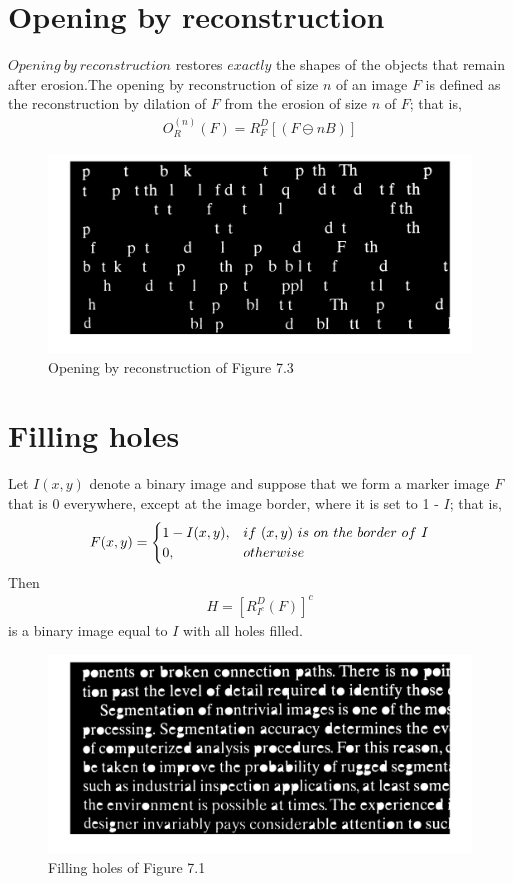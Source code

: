 \documentclass[11pt,oneside]{book}
\begin{document}
\section{Opening by reconstruction}
$Opening\ by\ reconstruction$ restores $exactly$ the shapes of the objects that remain after erosion.The opening by reconstruction of size $n$ of an image $F$ is defined as the reconstruction by dilation of $F$ from the erosion of size $n$ of $F$; that is,
\begin{align}
  O_R^{(n)}(F)=R_F^D[(F\ominus nB)]
\end{align}
\begin{figure}[!htb]
   \centering  
   \includegraphics[width=1\textwidth]{images/8/image_1.jpg}
   \caption{Opening by reconstruction of Figure 7.3}
\end{figure}
\newpage
\section{Filling holes}
Let $I(x, y)$ denote a binary image and suppose that we form a marker image $F$ that is 0 everywhere, except at the image border, where it is set to 1 - $I$; that is,
\begin{eqnarray}F(x,y)=
\begin{cases}
1-I(x,y), &if\ (x, y)\ is\ on\ the\ border\ of\ I \cr 0,&otherwise\end{cases}
\end{eqnarray}
Then
\begin{align}
H = [R_{I^c}^D(F)]^c
\end{align}
is a binary image equal to $I$ with all holes filled.
\begin{figure}[!htb]
   \centering  
   \includegraphics[width=1\textwidth]{images/8/image_2.jpg}
   \caption{Filling holes of Figure 7.1}
\end{figure}
\newpage
\end{document}
